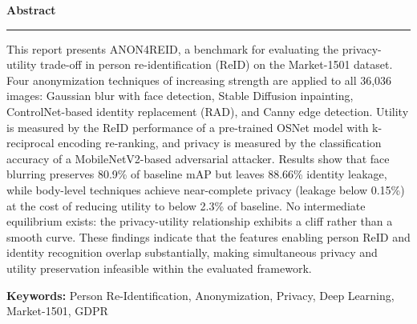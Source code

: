 \documentclass[a4paper,12pt, bibliography=totoc]{scrreprt}
\makeatletter
\newcommand\frontmatter{%
    \clearpage
  \pagenumbering{roman}}
\newcommand\mainmatter{%
    \clearpage
    \pagenumbering{arabic}%
    \renewcommand{\chapter}{%
        \par\addvspace{2\baselineskip}%
        \thispagestyle{plain}%
        \global\@topnum\z@
        \@afterindentfalse
        \secdef\@chapter\@schapter
    }%
}
\newcommand\backmatter{%
    \clearpage
   }
\makeatother
\begin{document}
    

\clearpage
\thispagestyle{empty}
\vspace*{2cm}
\begin{center}
    {\Large\color{cfDark}\textbf{Abstract}}\\[0.3em]
    {\color{cfAmber}\rule{0.4\textwidth}{1.5pt}}
\end{center}
\vspace{1em}

\noindent
This report presents ANON4REID, a benchmark for evaluating the privacy-utility trade-off in person re-identification (ReID) on the Market-1501 dataset. Four anonymization techniques of increasing strength are applied to all 36,036 images: Gaussian blur with face detection, Stable Diffusion inpainting, ControlNet-based identity replacement (RAD), and Canny edge detection. Utility is measured by the ReID performance of a pre-trained OSNet model with k-reciprocal encoding re-ranking, and privacy is measured by the classification accuracy of a MobileNetV2-based adversarial attacker. Results show that face blurring preserves 80.9\% of baseline mAP but leaves 88.66\% identity leakage, while body-level techniques achieve near-complete privacy (leakage below 0.15\%) at the cost of reducing utility to below 2.3\% of baseline. No intermediate equilibrium exists: the privacy-utility relationship exhibits a cliff rather than a smooth curve. These findings indicate that the features enabling person ReID and identity recognition overlap substantially, making simultaneous privacy and utility preservation infeasible within the evaluated framework.

\vspace{1.5em}
\noindent\textbf{Keywords:} Person Re-Identification, Anonymization, Privacy, Deep Learning, Market-1501, GDPR

\frontmatter
    \glsaddall
    \printnoidxglossary[type=\acronymtype,title=Acronyms]
    \tableofcontents
\mainmatter
    
    
    
    
    
    
    

\appendix
    


\backmatter
    \printbibliography[heading=bibintoc,title={References}]
    \listoffigures
    \listoftables
    \lstlistoflistings

\end{document}
